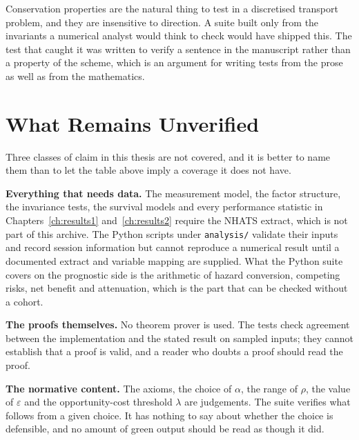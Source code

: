 Conservation properties are the natural thing to test in a discretised
transport problem, and they are insensitive to direction. A suite built only
from the invariants a numerical analyst would think to check would have shipped
this. The test that caught it was written to verify a sentence in the
manuscript rather than a property of the scheme, which is an argument for
writing tests from the prose as well as from the mathematics.

\section{What Remains Unverified}
\label{sec:F_limits}

Three classes of claim in this thesis are not covered, and it is better to name
them than to let the table above imply a coverage it does not have.

\textbf{Everything that needs data.} The measurement model, the factor
structure, the invariance tests, the survival models and every performance
statistic in Chapters~\ref{ch:results1} and~\ref{ch:results2} require the NHATS
extract, which is not part of this archive. The Python scripts under
\texttt{analysis/} validate their inputs and record session information but
cannot reproduce a numerical result until a documented extract and variable
mapping are supplied. What the Python suite covers on the prognostic side is
the arithmetic of hazard conversion, competing risks, net benefit and
attenuation, which is the part that can be checked without a cohort.

\textbf{The proofs themselves.} No theorem prover is used. The tests check
agreement between the implementation and the stated result on sampled inputs;
they cannot establish that a proof is valid, and a reader who doubts a proof
should read the proof.

\textbf{The normative content.} The axioms, the choice of $\alpha$, the range
of $\rho$, the value of $\varepsilon$ and the opportunity-cost threshold
$\lambda$ are judgements. The suite verifies what follows from a given choice.
It has nothing to say about whether the choice is defensible, and no amount of
green output should be read as though it did.
